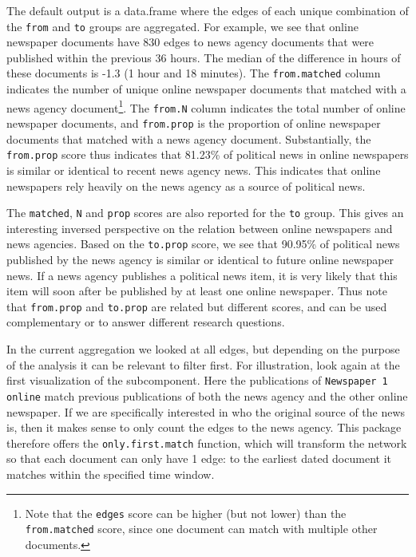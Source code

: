 The default output is a data.frame where the edges of each unique
combination of the \texttt{from} and \texttt{to} groups are aggregated.
For example, we see that online newspaper documents have 830 edges to
news agency documents that were published within the previous 36 hours.
The median of the difference in hours of these documents is -1.3 (1 hour
and 18 minutes). The \texttt{from.matched} column indicates the number
of unique online newspaper documents that matched with a news agency
document\footnote{Note that the \texttt{edges} score can be higher (but
  not lower) than the \texttt{from.matched} score, since one document
  can match with multiple other documents.}. The \texttt{from.N} column
indicates the total number of online newspaper documents, and
\texttt{from.prop} is the proportion of online newspaper documents that
matched with a news agency document. Substantially, the
\texttt{from.prop} score thus indicates that 81.23\% of political news
in online newspapers is similar or identical to recent news agency news.
This indicates that online newspapers rely heavily on the news agency as
a source of political news.

The \texttt{matched}, \texttt{N} and \texttt{prop} scores are also
reported for the \texttt{to} group. This gives an interesting inversed
perspective on the relation between online newspapers and news agencies.
Based on the \texttt{to.prop} score, we see that 90.95\% of political
news published by the news agency is similar or identical to future
online newspaper news. If a news agency publishes a political news item,
it is very likely that this item will soon after be published by at
least one online newspaper. Thus note that \texttt{from.prop} and
\texttt{to.prop} are related but different scores, and can be used
complementary or to answer different research questions.

In the current aggregation we looked at all edges, but depending on the
purpose of the analysis it can be relevant to filter first. For
illustration, look again at the first visualization of the subcomponent.
Here the publications of \texttt{Newspaper 1 online} match previous
publications of both the news agency and the other online newspaper. If
we are specifically interested in who the original source of the news
is, then it makes sense to only count the edges to the news agency. This
package therefore offers the \texttt{only.first.match} function, which
will transform the network so that each document can only have 1 edge:
to the earliest dated document it matches within the specified time
window.

